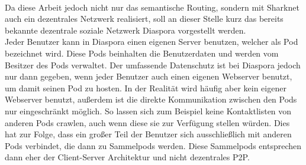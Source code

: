 \\Da diese Arbeit jedoch nicht nur das semantische Routing, sondern mit Sharknet auch ein dezentrales Netzwerk realisiert, soll an dieser Stelle kurz das bereits bekannte dezentrale soziale Netzwerk Diaspora vorgestellt werden.
\\ Jeder Benutzer kann in Diaspora einen eigenen Server benutzen, welcher als Pod bezeichnet wird. Diese Pods beinhalten die Benutzerdaten und werden vom Besitzer des Pods verwaltet. Der umfassende Datenschutz ist bei Diaspora jedoch nur dann gegeben, wenn jeder Benutzer auch einen eigenen Webserver benutzt, um damit seinen Pod zu hosten. In der Realität wird häufig aber kein eigener Webserver benutzt, außerdem ist die direkte Kommunikation zwischen den Pods nur eingeschränkt möglich. So lassen sich zum Beispiel keine Kontaktlisten von anderen Pods crawlen, auch wenn diese sie zur Verfügung stellen würden. Dies hat zur Folge, dass ein großer Teil der Benutzer sich ausschließlich mit anderen Pods verbindet, die dann zu Sammelpods werden. Diese Sammelpods entsprechen dann eher der Client-Server Architektur und nicht dezentrales P2P.


